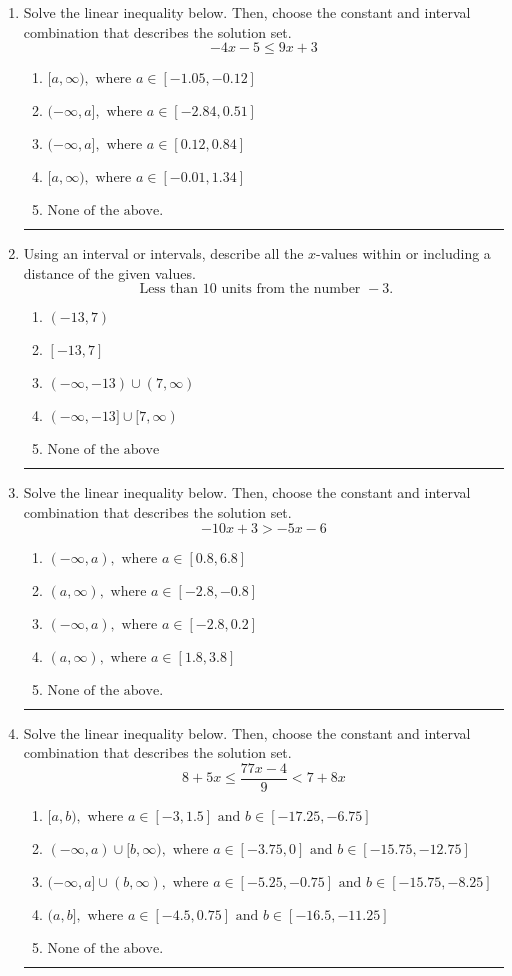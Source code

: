 \documentclass[14pt]{extbook}
\newcommand{\litem}[1]{\item#1\hspace*{-1cm}\rule{\textwidth}{0.4pt}}
\begin{document}
\begin{enumerate}
{\begin{enumerate}[label=\Alph*.]
\end{enumerate} }
\litem{
Solve the linear inequality below. Then, choose the constant and interval combination that describes the solution set.\[ -4x -5 \leq 9x + 3 \]\begin{enumerate}[label=\Alph*.]
\item \( [a, \infty), \text{ where } a \in [-1.05, -0.12] \)
\item \( (-\infty, a], \text{ where } a \in [-2.84, 0.51] \)
\item \( (-\infty, a], \text{ where } a \in [0.12, 0.84] \)
\item \( [a, \infty), \text{ where } a \in [-0.01, 1.34] \)
\item \( \text{None of the above}. \)

\end{enumerate} }
\litem{
Using an interval or intervals, describe all the $x$-values within or including a distance of the given values.\[ \text{ Less than } 10 \text{ units from the number } -3. \]\begin{enumerate}[label=\Alph*.]
\item \( (-13, 7) \)
\item \( [-13, 7] \)
\item \( (-\infty, -13) \cup (7, \infty) \)
\item \( (-\infty, -13] \cup [7, \infty) \)
\item \( \text{None of the above} \)

\end{enumerate} }
\litem{
Solve the linear inequality below. Then, choose the constant and interval combination that describes the solution set.\[ -10x + 3 > -5x -6 \]\begin{enumerate}[label=\Alph*.]
\item \( (-\infty, a), \text{ where } a \in [0.8, 6.8] \)
\item \( (a, \infty), \text{ where } a \in [-2.8, -0.8] \)
\item \( (-\infty, a), \text{ where } a \in [-2.8, 0.2] \)
\item \( (a, \infty), \text{ where } a \in [1.8, 3.8] \)
\item \( \text{None of the above}. \)

\end{enumerate} }
\litem{
Solve the linear inequality below. Then, choose the constant and interval combination that describes the solution set.\[ 8 + 5 x \leq \frac{77 x - 4}{9} < 7 + 8 x \]\begin{enumerate}[label=\Alph*.]
\item \( [a, b), \text{ where } a \in [-3, 1.5] \text{ and } b \in [-17.25, -6.75] \)
\item \( (-\infty, a) \cup [b, \infty), \text{ where } a \in [-3.75, 0] \text{ and } b \in [-15.75, -12.75] \)
\item \( (-\infty, a] \cup (b, \infty), \text{ where } a \in [-5.25, -0.75] \text{ and } b \in [-15.75, -8.25] \)
\item \( (a, b], \text{ where } a \in [-4.5, 0.75] \text{ and } b \in [-16.5, -11.25] \)
\item \( \text{None of the above.} \)


\end{enumerate}}
\end{enumerate}
\end{document}
